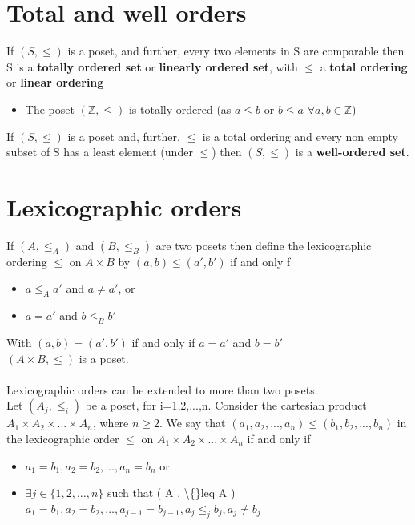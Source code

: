 \documentclass{article}[18pt]
\begin{document}
 \section{Total and well orders}
 If $(S,\leqslant)$ is a poset, and further, every two elements in S are comparable then S is a \textbf{totally ordered set} or \textbf{linearly ordered set}, with $\leqslant$ a \textbf{total ordering} or \textbf{linear ordering}
\begin{itemize}
 	\item The poset $(\mathbb{Z},\leqslant)$ is totally ordered (as $a\leqslant b$ or $b\leqslant a$ $\forall a,b \in \mathbb{Z}$)
\end{itemize}
If $(S,\leqslant)$ is a poset and, further, $\leqslant$ is a total ordering and every non empty subset of S has a least element (under $\leqslant$) then $(S,\leqslant)$ is a \textbf{well-ordered set}.
\section{Lexicographic orders}
If $(A,\leqslant_A)$ and $(B,\leqslant_B)$ are two posets then define the lexicographic ordering $\leqslant$ on $A\times B$  by $(a,b)\leqslant(a',b')$ if and only f
\begin{itemize}
	\item $a\leqslant_A a'$ and $a\neq a'$, or
	\item $a=a'$ and $b\leqslant_B b'$
\end{itemize}
With $(a,b)=(a',b')$ if and only if $a=a'$ and $b=b'$\\
$(A\times B,\leqslant)$ is a poset.\\
\\
Lexicographic orders can be extended to more than two posets.\\
Let $(A_j,\leqslant_i)$ be a poset, for i=1,2,...,n. Consider the cartesian product $A_1\times A_2\times...\times A_n$, where $n\geqslant 2$. We say that $(a_1,a_2,...,a_n)\leqslant (b_1,b_2,...,b_n)$ in the lexicographic order $\leqslant$ on $A_1\times A_2 \times ... \times A_n$ if and only if
\begin{itemize}
	\item $a_1=b_1, a_2=b_2,...,a_n=b_n$ or
	\item $\exists j\in \{1,2,...,n\}$ such that ( A , \textbackslash\{\}leq A ) $a _ { 1 } = b _ { 1 } , a _ { 2 } = b _ { 2 } , \dots , a _ { j - 1 } = b _ { j - 1 } , a _ { j } \leq_j b _ { j } , a _ { j } \neq b _ { j }$
\end{itemize}
\end{document}
